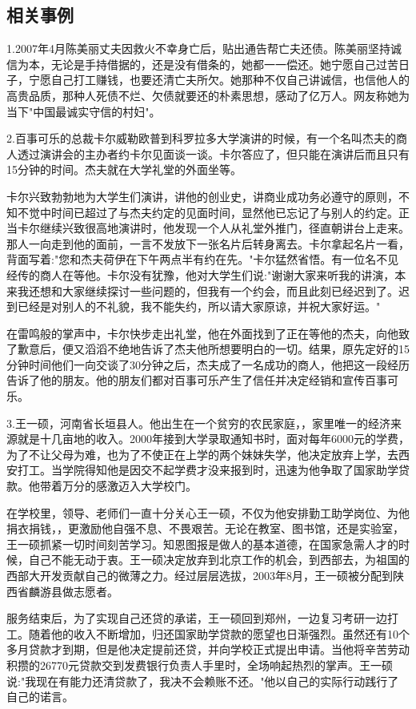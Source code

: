 \documentclass[UTF8]{ctexart}
\begin{document}
\subsection{相关事例}
1.2007年4月陈美丽丈夫因救火不幸身亡后，贴出通告帮亡夫还债。陈美丽坚持诚信为本，无论是手持借据的，还是没有借条的，她都一一偿还。她宁愿自己过苦日子，宁愿自己打工赚钱，也要还清亡夫所欠。她那种不仅自己讲诚信，也信他人的高贵品质，那种人死债不烂、欠债就要还的朴素思想，感动了亿万人。网友称她为当下"中国最诚实守信的村妇"。\par
2.百事可乐的总裁卡尔威勒欧普到科罗拉多大学演讲的时候，有一个名叫杰夫的商人透过演讲会的主办者约卡尔见面谈一谈。卡尔答应了，但只能在演讲后而且只有15分钟的时间。杰夫就在大学礼堂的外面坐等。\par
卡尔兴致勃勃地为大学生们演讲，讲他的创业史，讲商业成功务必遵守的原则，不知不觉中时间已超过了与杰夫约定的见面时间，显然他已忘记了与别人的约定。正当卡尔继续兴致很高地演讲时，他发现一个人从礼堂外推门，径直朝讲台上走来。那人一向走到他的面前，一言不发放下一张名片后转身离去。卡尔拿起名片一看，背面写着:"您和杰夫荷伊在下午两点半有约在先。"卡尔猛然省悟。有一位名不见经传的商人在等他。卡尔没有犹豫，他对大学生们说:"谢谢大家来听我的讲演，本来我还想和大家继续探讨一些问题的，但我有一个约会，而且此刻已经迟到了。迟到已经是对别人的不礼貌，我不能失约，所以请大家原谅，并祝大家好运。"\par
在雷鸣般的掌声中，卡尔快步走出礼堂，他在外面找到了正在等他的杰夫，向他致了歉意后，便又滔滔不绝地告诉了杰夫他所想要明白的一切。结果，原先定好的15分钟时间他们一向交谈了30分钟之后，杰夫成了一名成功的商人，他把这一段经历告诉了他的朋友。他的朋友们都对百事可乐产生了信任并决定经销和宣传百事可乐。\par
3.王一硕，河南省长垣县人。他出生在一个贫穷的农民家庭，，家里唯一的经济来源就是十几亩地的收入。2000年接到大学录取通知书时，面对每年6000元的学费，为了不让父母为难，也为了不使正在上学的两个妹妹失学，他决定放弃上学，去西安打工。当学院得知他是因交不起学费才没来报到时，迅速为他争取了国家助学贷款。他带着万分的感激迈入大学校门。\par
在学校里，领导、老师们一直十分关心王一硕，不仅为他安排勤工助学岗位、为他捐衣捐钱，，更激励他自强不息、不畏艰苦。无论在教室、图书馆，还是实验室，王一硕抓紧一切时间刻苦学习。知恩图报是做人的基本道德，在国家急需人才的时候，自己不能无动于衷。王一硕决定放弃到北京工作的机会，到西部去，为祖国的西部大开发贡献自己的微薄之力。经过层层选拔，2003年8月，王一硕被分配到陕西省麟游县做志愿者。\par
服务结束后，为了实现自己还贷的承诺，王一硕回到郑州，一边复习考研一边打工。随着他的收入不断增加，归还国家助学贷款的愿望也日渐强烈。虽然还有10个多月贷款才到期，但是他决定提前还贷，并向学校正式提出申请。当他将辛苦劳动积攒的26770元贷款交到发费银行负责人手里时，全场响起热烈的掌声。王一硕说:"我现在有能力还清贷款了，我决不会赖账不还。"他以自己的实际行动践行了自己的诺言。\par
\end{document}

